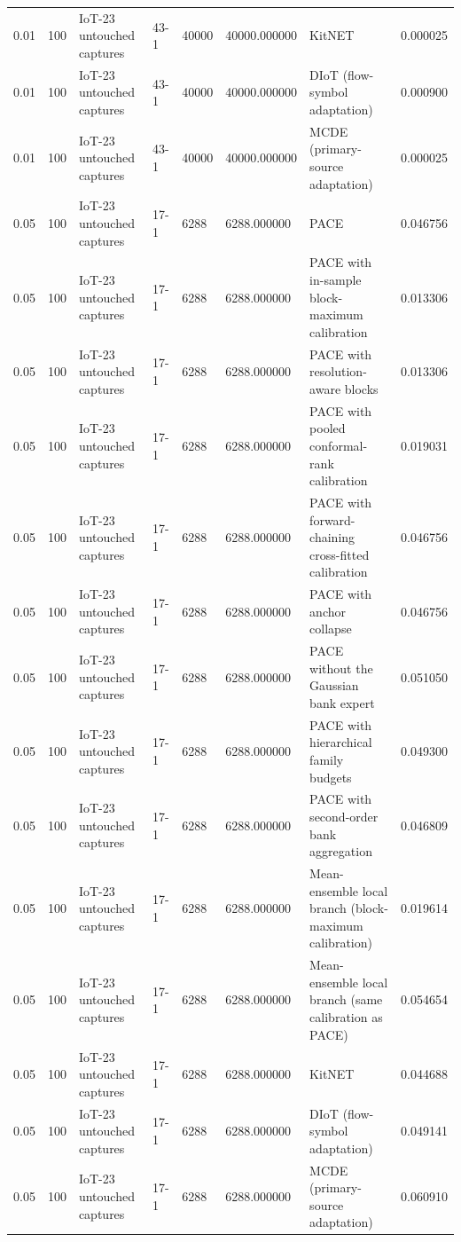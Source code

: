 \begin{tabular}{llllllll}
0.01 & 100 & IoT-23 untouched captures & 43-1 & 40000 & 40000.000000 & KitNET & 0.000025 \\
0.01 & 100 & IoT-23 untouched captures & 43-1 & 40000 & 40000.000000 & DIoT (flow-symbol adaptation) & 0.000900 \\
0.01 & 100 & IoT-23 untouched captures & 43-1 & 40000 & 40000.000000 & MCDE (primary-source adaptation) & 0.000025 \\
0.05 & 100 & IoT-23 untouched captures & 17-1 & 6288 & 6288.000000 & PACE & 0.046756 \\
0.05 & 100 & IoT-23 untouched captures & 17-1 & 6288 & 6288.000000 & PACE with in-sample block-maximum calibration & 0.013306 \\
0.05 & 100 & IoT-23 untouched captures & 17-1 & 6288 & 6288.000000 & PACE with resolution-aware blocks & 0.013306 \\
0.05 & 100 & IoT-23 untouched captures & 17-1 & 6288 & 6288.000000 & PACE with pooled conformal-rank calibration & 0.019031 \\
0.05 & 100 & IoT-23 untouched captures & 17-1 & 6288 & 6288.000000 & PACE with forward-chaining cross-fitted calibration & 0.046756 \\
0.05 & 100 & IoT-23 untouched captures & 17-1 & 6288 & 6288.000000 & PACE with anchor collapse & 0.046756 \\
0.05 & 100 & IoT-23 untouched captures & 17-1 & 6288 & 6288.000000 & PACE without the Gaussian bank expert & 0.051050 \\
0.05 & 100 & IoT-23 untouched captures & 17-1 & 6288 & 6288.000000 & PACE with hierarchical family budgets & 0.049300 \\
0.05 & 100 & IoT-23 untouched captures & 17-1 & 6288 & 6288.000000 & PACE with second-order bank aggregation & 0.046809 \\
0.05 & 100 & IoT-23 untouched captures & 17-1 & 6288 & 6288.000000 & Mean-ensemble local branch (block-maximum calibration) & 0.019614 \\
0.05 & 100 & IoT-23 untouched captures & 17-1 & 6288 & 6288.000000 & Mean-ensemble local branch (same calibration as PACE) & 0.054654 \\
0.05 & 100 & IoT-23 untouched captures & 17-1 & 6288 & 6288.000000 & KitNET & 0.044688 \\
0.05 & 100 & IoT-23 untouched captures & 17-1 & 6288 & 6288.000000 & DIoT (flow-symbol adaptation) & 0.049141 \\
0.05 & 100 & IoT-23 untouched captures & 17-1 & 6288 & 6288.000000 & MCDE (primary-source adaptation) & 0.060910 \\

\end{tabular}
